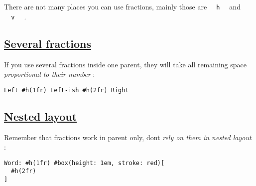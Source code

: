 There are not many places you can use fractions, mainly those are
\texttt{\ }{\texttt{\ h\ }}\texttt{\ } and
\texttt{\ }{\texttt{\ v\ }}\texttt{\ } .

\subsection{\texorpdfstring{\hyperref[several-fractions]{Several
fractions}}{Several fractions}}\label{several-fractions}

If you use several fractions inside one parent, they will take all
remaining space \emph{proportional to their number} :

\begin{verbatim}
Left #h(1fr) Left-ish #h(2fr) Right
\end{verbatim}

\pandocbounded{}

\subsection{\texorpdfstring{\hyperref[nested-layout]{Nested
layout}}{Nested layout}}\label{nested-layout}

Remember that fractions work in parent only, don\textquotesingle t
\emph{rely on them in nested layout} :

\begin{verbatim}
Word: #h(1fr) #box(height: 1em, stroke: red)[
  #h(2fr)
]
\end{verbatim}

\pandocbounded{}
